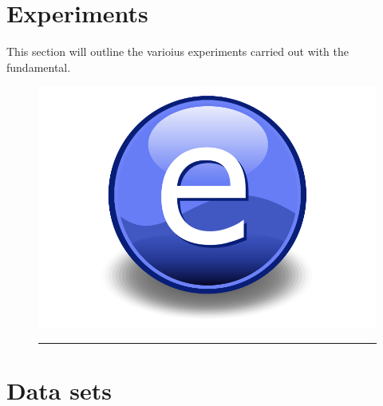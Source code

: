 \section{Experiments}
This section will outline the varioius experiments carried out with the fundamental. 


\begin{figure}[htbp]
	\centering
		\includegraphics{Figures/Electron.pdf}
		\rule{35em}{0.5pt}
	\caption{}
	\label{fig:}
\end{figure}





\section{Data sets}


